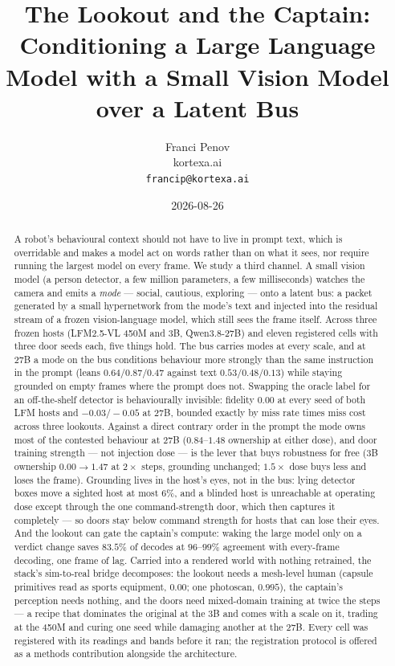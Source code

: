\documentclass[11pt]{article}
\title{The Lookout and the Captain:\\Conditioning a Large Language Model with a Small Vision Model over a Latent Bus}
\author{Franci Penov \\ kortexa.ai \\ \texttt{francip@kortexa.ai}}
\date{2026-08-26}
\begin{document}
\maketitle

\begin{abstract}

A robot's behavioural context should not have to live in prompt text,
which is overridable and makes a model act on words rather than on what
it sees, nor require running the largest model on every frame. We study
a third channel. A small vision model (a person detector, a few million
parameters, a few milliseconds) watches the camera and emits a
\emph{mode} --- social, cautious, exploring --- onto a latent bus: a
packet generated by a small hypernetwork from the mode's text and
injected into the residual stream of a frozen vision-language model,
which still sees the frame itself. Across three frozen hosts (LFM2.5-VL
450M and 3B, Qwen3.8-27B) and eleven registered cells with three door
seeds each, five things hold. The bus carries modes at every scale, and
at 27B a mode on the bus conditions behaviour more strongly than the
same instruction in the prompt (leans $0.64/0.87/0.47$ against text
$0.53/0.48/0.13$) while staying grounded on empty frames where the
prompt does not. Swapping the oracle label for an off-the-shelf
detector is behaviourally invisible: fidelity $0.00$ at every seed of
both LFM hosts and $-0.03/-0.05$ at 27B, bounded exactly by miss rate
times miss cost across three lookouts. Against a direct contrary order
in the prompt the mode owns most of the contested behaviour at 27B
($0.84$--$1.48$ ownership at either dose), and door training strength
--- not injection dose --- is the lever that buys robustness for free
(3B ownership $0.00\to1.47$ at $2\times$ steps, grounding unchanged;
$1.5\times$ dose buys less and loses the frame). Grounding lives in the
host's eyes, not in the bus: lying detector boxes move a sighted host
at most $6\%$, and a blinded host is unreachable at operating dose
except through the one command-strength door, which then captures it
completely --- so doors stay below command strength for hosts that can
lose their eyes. And the lookout can gate the captain's compute: waking
the large model only on a verdict change saves $83.5\%$ of decodes at
$96$--$99\%$ agreement with every-frame decoding, one frame of lag.
Carried into a rendered world with nothing retrained, the stack's
sim-to-real bridge decomposes: the lookout needs a mesh-level human
(capsule primitives read as sports equipment, $0.00$; one photoscan,
$0.995$), the captain's perception needs nothing, and the doors need
mixed-domain training at twice the steps --- a recipe that dominates
the original at the 3B and comes with a scale on it, trading at the
450M and curing one seed while damaging another at the 27B. Every cell
was registered with its
readings and bands before it ran; the registration protocol is offered
as a methods contribution alongside the architecture.

\end{abstract}
\end{document}
